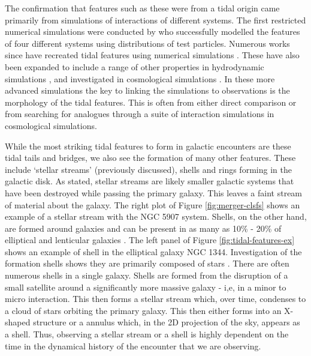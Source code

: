 The confirmation that features such as these were from a tidal origin came primarily from simulations of interactions of different systems. The first restricted numerical simulations were conducted by \citet{1972ApJ...178..623T} who successfully modelled the features of four different systems using distributions of test particles. Numerous works since have recreated tidal features using numerical simulations \citep{1993ApJ...410..586S, 2008AN....329.1046P, 2009AJ....137.3071B, 2016A&C....16...26W}. These have also been expanded to include a range of other properties in hydrodynamic simulations \citep{2013MNRAS.430.1901H, 2019MNRAS.485.1320M, 2021MNRAS.503.3113M, 2022MNRAS.509.2720S}, and investigated in cosmological simulations \citep{2015MNRAS.452.2845K, 2019MNRAS.490.2139R, 2020MNRAS.493.3716H, 2023RAA....23k5018D}. In these more advanced simulations the key to linking the simulations to observations is the morphology of the tidal features. This is often from either direct comparison or from searching for analogues through a suite of interaction simulations in cosmological simulations.

While the most striking tidal features to form in galactic encounters are these tidal tails and bridges, we also see the formation of many other features. These include `stellar streams' (previously discussed), shells and rings forming in the galactic disk. As stated, stellar streams are likely smaller galactic systems that have been destroyed while passing the primary galaxy. This leaves a faint stream of material about the galaxy. The right plot of Figure \ref{fig:merger-clsfs} shows an example of a stellar stream with the NGC 5907 system. Shells, on the other hand, are formed around galaxies and can be present in as many as 10\% - 20\% of elliptical and lenticular galaxies \citep{1983ApJ...274..534M, 2013ApJ...765...28A}. The left panel of Figure \ref{fig:tidal-features-ex} shows an example of shell in the elliptical galaxy NGC 1344. Investigation of the formation shells shows they are primarily composed of stars \citep{1984ApJ...279..596Q}. There are often numerous shells in a single galaxy. Shells are formed from the disruption of a small satellite around a significantly more massive galaxy - i,e, in a minor to micro interaction. This then forms a stellar stream which, over time, condenses to a cloud of stars orbiting the primary galaxy. This then either forms into an X-shaped structure or a annulus which, in the 2D projection of the sky, appears as a shell. Thus, observing a stellar stream or a shell is highly dependent on the time in the dynamical history of the encounter that we are observing.

